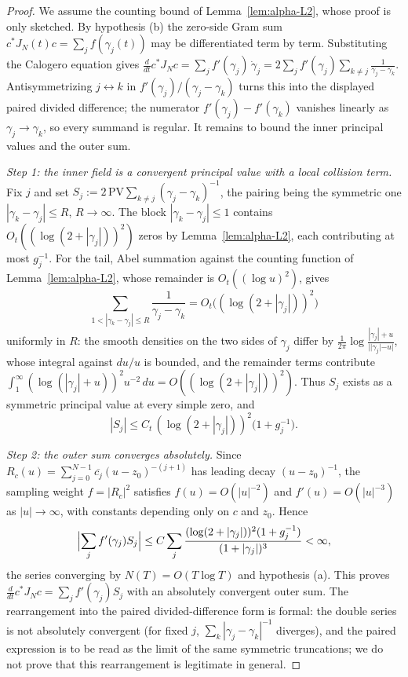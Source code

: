 \documentclass[11pt]{amsart}
\theoremstyle{definition}
\theoremstyle{remark}
\theoremstyle{definition}
\begin{document}
\begin{proof}
We assume the counting bound of Lemma~\ref{lem:alpha-L2}, whose proof is only sketched.
By hypothesis \textnormal{(b)} the zero-side Gram sum $c^*J_N(t)c=\sum_j f(\gamma_j(t))$ may be
differentiated term by term.  Substituting the Calogero equation gives $\frac{d}{dt}c^*J_Nc=\sum_j f'(\gamma_j)\,\dot\gamma_j
=2\sum_j f'(\gamma_j)\sum_{k\ne j}\frac1{\gamma_j-\gamma_k}$.  Antisymmetrizing $j\leftrightarrow k$ in
$f'(\gamma_j)/(\gamma_j-\gamma_k)$ turns this into the displayed paired divided difference; the numerator
$f'(\gamma_j)-f'(\gamma_k)$ vanishes linearly as $\gamma_j\to\gamma_k$, so every summand is regular.
It remains to bound the inner principal values and the outer sum.

\emph{Step 1: the inner field is a convergent principal value with a local collision term.}
Fix $j$ and set $S_j:=2\,\mathrm{PV}\sum_{k\ne j}(\gamma_j-\gamma_k)^{-1}$, the pairing being the
symmetric one $|\gamma_k-\gamma_j|\le R$, $R\to\infty$.  The block $|\gamma_k-\gamma_j|\le1$ contains
$O_t((\log(2+|\gamma_j|))^2)$ zeros by Lemma~\ref{lem:alpha-L2}, each contributing at most $g_j^{-1}$.
For the tail, Abel summation against the counting function of Lemma~\ref{lem:alpha-L2}, whose remainder
is $O_t((\log u)^2)$, gives
\[
   \sum_{1<|\gamma_k-\gamma_j|\le R}\frac1{\gamma_j-\gamma_k}
   =O_t\bigl((\log(2+|\gamma_j|))^2\bigr)
\]
uniformly in $R$: the smooth densities on the two sides of $\gamma_j$ differ by
$\tfrac1{2\pi}\log\tfrac{|\gamma_j|+u}{||\gamma_j|-u|}$, whose integral against $du/u$ is bounded, and the
remainder terms contribute $\int_1^\infty(\log(|\gamma_j|+u))^2u^{-2}\,du=O((\log(2+|\gamma_j|))^2)$.  Thus
$S_j$ exists as a symmetric principal value at every simple zero, and
\[
   |S_j|\le C_t\,(\log(2+|\gamma_j|))^2\bigl(1+g_j^{-1}\bigr).
\]

\emph{Step 2: the outer sum converges absolutely.}  Since $R_c(u)=\sum_{j=0}^{N-1}\overline{c_j}
(u-z_0)^{-(j+1)}$ has leading decay $(u-z_0)^{-1}$, the sampling weight $f=|R_c|^2$ satisfies
$f(u)=O(|u|^{-2})$ and $f'(u)=O(|u|^{-3})$ as $|u|\to\infty$, with constants depending only on $c$ and
$z_0$.  Hence
\[
   \Bigl|\sum_j f'(\gamma_j)S_j\Bigr|
   \le C\sum_j\frac{(\log(2+|\gamma_j|))^2(1+g_j^{-1})}{(1+|\gamma_j|)^{3}}<\infty,
\]
the series converging by $N(T)=O(T\log T)$ and hypothesis \textnormal{(a)}.  This proves
$\frac{d}{dt}c^*J_Nc=\sum_jf'(\gamma_j)S_j$ with an absolutely convergent outer sum.  The rearrangement
into the paired divided-difference form is formal: the double series is not absolutely convergent
(for fixed $j$, $\sum_k|\gamma_j-\gamma_k|^{-1}$ diverges), and the paired expression is to be read as
the limit of the same symmetric truncations; we do not prove that this rearrangement is legitimate in
general.
\end{proof}
\end{document}
